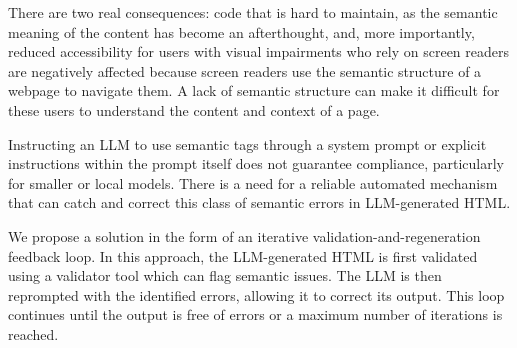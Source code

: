  

There are two real consequences: code that is hard to maintain, as the semantic meaning of the content has become an afterthought, and, more importantly, reduced accessibility for users with visual impairments who rely on screen readers are negatively affected because screen readers use the semantic structure of a webpage to navigate them. A lack of semantic structure can make it difficult for these users to understand the content and context of a page.



Instructing an LLM to use semantic tags through a system prompt or explicit instructions within the prompt itself does not guarantee compliance, particularly for smaller or local models. There is a need for a reliable automated mechanism that can catch and correct this class of semantic errors in LLM-generated HTML. 




We propose a solution in the form of an iterative validation-and-regeneration feedback loop. In this approach, the LLM-generated HTML is first validated using a validator tool which can flag semantic issues. The LLM is then reprompted with the identified errors, allowing it to correct its output. This loop continues until the output is free of errors or a maximum number of iterations is reached.

